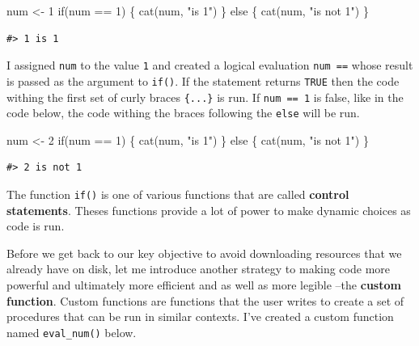\documentclass[
  letterpaper,
]{latex/krantz}
\newenvironment{Shaded}{\begin{snugshade}}{\end{snugshade}}
\newcommand{\ControlFlowTok}[1]{\textcolor[rgb]{0.00,0.23,0.31}{#1}}
\newcommand{\DecValTok}[1]{\textcolor[rgb]{0.68,0.00,0.00}{#1}}
\newcommand{\FunctionTok}[1]{\textcolor[rgb]{0.28,0.35,0.67}{#1}}
\newcommand{\NormalTok}[1]{\textcolor[rgb]{0.00,0.23,0.31}{#1}}
\newcommand{\OtherTok}[1]{\textcolor[rgb]{0.00,0.23,0.31}{#1}}
\newcommand{\SpecialCharTok}[1]{\textcolor[rgb]{0.37,0.37,0.37}{#1}}
\newcommand{\StringTok}[1]{\textcolor[rgb]{0.13,0.47,0.30}{#1}}
\begin{document}
\begin{Shaded}
\begin{Highlighting}[]
\NormalTok{num }\OtherTok{\textless{}{-}} \DecValTok{1}
\ControlFlowTok{if}\NormalTok{(num }\SpecialCharTok{==} \DecValTok{1}\NormalTok{) \{ }
  \FunctionTok{cat}\NormalTok{(num, }\StringTok{"is 1"}\NormalTok{) }
\NormalTok{  \} }\ControlFlowTok{else}\NormalTok{ \{}
  \FunctionTok{cat}\NormalTok{(num, }\StringTok{"is not 1"}\NormalTok{)}
\NormalTok{  \}}
\end{Highlighting}
\end{Shaded}

\begin{verbatim}
#> 1 is 1
\end{verbatim}

I assigned \texttt{num} to the value \texttt{1} and created a logical
evaluation \texttt{num\ ==} whose result is passed as the argument to
\texttt{if()}. If the statement returns \texttt{TRUE} then the code
withing the first set of curly braces \texttt{\{...\}} is run. If
\texttt{num\ ==\ 1} is false, like in the code below, the code withing
the braces following the \texttt{else} will be run.

\begin{Shaded}
\begin{Highlighting}[]
\NormalTok{num }\OtherTok{\textless{}{-}} \DecValTok{2}
\ControlFlowTok{if}\NormalTok{(num }\SpecialCharTok{==} \DecValTok{1}\NormalTok{) \{ }
  \FunctionTok{cat}\NormalTok{(num, }\StringTok{"is 1"}\NormalTok{) }
\NormalTok{  \} }\ControlFlowTok{else}\NormalTok{ \{}
  \FunctionTok{cat}\NormalTok{(num, }\StringTok{"is not 1"}\NormalTok{)}
\NormalTok{  \}}
\end{Highlighting}
\end{Shaded}

\begin{verbatim}
#> 2 is not 1
\end{verbatim}

The function \texttt{if()} is one of various functions that are called
\textbf{control statements}. Theses functions provide a lot of power to
make dynamic choices as code is run.

Before we get back to our key objective to avoid downloading resources
that we already have on disk, let me introduce another strategy to
making code more powerful and ultimately more efficient and as well as
more legible --the \textbf{custom function}. Custom functions are
functions that the user writes to create a set of procedures that can be
run in similar contexts. I've created a custom function named
\texttt{eval\_num()} below.
\end{document}
